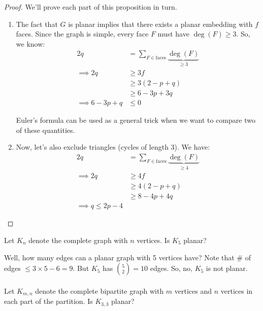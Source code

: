 \documentclass[]{article}
\theoremstyle{definition}
\begin{document}
			\begin{proof}
				We'll prove each part of this proposition in turn.
				\begin{enumerate}
					\item 
						The fact that $G$ is planar implies that there exists a planar embedding with $f$ faces. Since the graph is simple, every face $F$ must have $\deg(F) \ge 3$. So, we know:
						\begin{align*}
							2q &= \sum_{F \in \text{faces}} \underbrace{\deg(F)}_{\ge 3} \\
							\implies 2q &\ge 3f \\
							&\ge 3(2 - p + q) \\
							&\ge 6 - 3p + 3q \\
							\implies 6 - 3p + q &\le 0
						\end{align*}

						Euler's formula can be used as a general trick when we want to compare two of these quantities.

					\item 
						Now, let's also exclude triangles (cycles of length 3). We have:
						\begin{align*}
							2q &= \sum_{F \in \text{faces}} \underbrace{\deg(F)}_{\ge 4} \\
							\implies 2q &\ge 4f \\
							&\ge 4(2 - p + q) \\
							&\ge 8 - 4p + 4q \\
							\implies q \le 2p - 4
						\end{align*}
				\end{enumerate}
			\end{proof}

			Let $K_n$ denote the complete graph with $n$ vertices. Is $K_5$ planar?
			\begin{center}
			\end{center}

			Well, how many edges can a planar graph with 5 vertices have? Note that \# of edges $\le 3 \times 5 - 6 = 9$. But $K_5$ has $\binom{5}{2} = 10$ edges. So, no, $K_5$ is not planar.
			\\ \\
			Let $K_{m, n}$ denote the complete bipartite graph with $m$ vertices and $n$ vertices in each part of the partition. Is $K_{3,3}$ planar?
\end{document}
